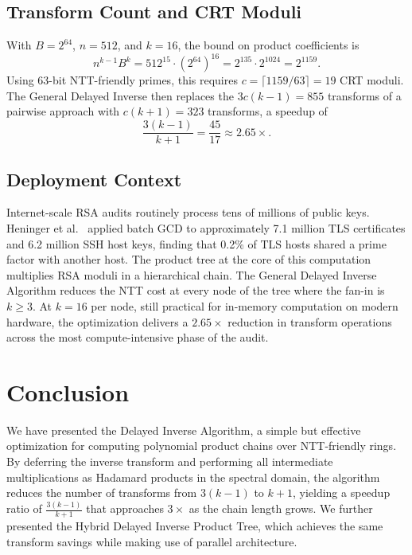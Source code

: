 \documentclass[runningheads]{llncs}
\begin{document}
\subsection*{Transform Count and CRT Moduli}

With $B = 2^{64}$, $n = 512$, and $k = 16$, the bound on product coefficients is
$$n^{k-1} B^k = 512^{15} \cdot \left(2^{64}\right)^{16} = 2^{135} \cdot 2^{1024} = 2^{1159}.$$
Using 63-bit NTT-friendly primes, this requires $c = \lceil 1159/63 \rceil = 19$ CRT moduli. The General Delayed Inverse then replaces the $3c(k-1) = 855$ transforms of a pairwise approach with $c(k+1) = 323$ transforms, a speedup of
$$\frac{3(k-1)}{k+1} = \frac{45}{17} \approx 2.65\times.$$

\subsection*{Deployment Context}

Internet-scale RSA audits routinely process tens of millions of public keys. Heninger et al.~\cite{heninger2012mining} applied batch GCD to approximately 7.1 million TLS certificates and 6.2 million SSH host keys, finding that 0.2\% of TLS hosts shared a prime factor with another host. The product tree at the core of this computation multiplies RSA moduli in a hierarchical chain. The General Delayed Inverse Algorithm reduces the NTT cost at every node of the tree where the fan-in is $k \geq 3$. At $k = 16$ per node, still practical for in-memory computation on modern hardware, the optimization delivers a $2.65\times$ reduction in transform operations across the most compute-intensive phase of the audit.

\section{Conclusion}

We have presented the Delayed Inverse Algorithm, a simple but effective optimization for computing polynomial product chains over NTT-friendly rings. By deferring the inverse transform and performing all intermediate multiplications as Hadamard products in the spectral domain, the algorithm reduces the number of transforms from $3(k-1)$ to $k+1$, yielding a speedup ratio of $\frac{3(k-1)}{k+1}$ that approaches $3\times$ as the chain length grows. We further presented the Hybrid Delayed Inverse Product Tree, which achieves the same transform savings while making use of parallel architecture.
\end{document}
